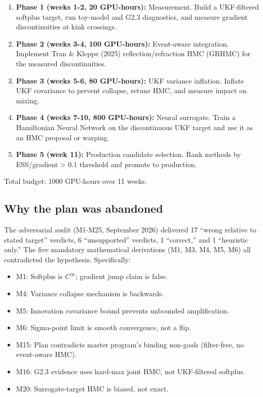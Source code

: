 \begin{enumerate}
\item \textbf{Phase 1 (weeks 1-2, 20 GPU-hours):} Measurement. Build a UKF-filtered softplus target, run toy-model and G2.3 diagnostics, and measure gradient discontinuities at kink crossings.
\item \textbf{Phase 2 (weeks 3-4, 100 GPU-hours):} Event-aware integration. Implement Tran \& Kleppe (2025) reflection/refraction HMC (GRHMC) for the measured discontinuities.
\item \textbf{Phase 3 (weeks 5-6, 80 GPU-hours):} UKF variance inflation. Inflate UKF covariance to prevent collapse, retune HMC, and measure impact on mixing.
\item \textbf{Phase 4 (weeks 7-10, 800 GPU-hours):} Neural surrogate. Train a Hamiltonian Neural Network on the discontinuous UKF target and use it as an HMC proposal or warping.
\item \textbf{Phase 5 (week 11):} Production candidate selection. Rank methods by ESS/gradient > 0.1 threshold and promote to production.
\end{enumerate}

Total budget: 1000 GPU-hours over 11 weeks.

\subsection{Why the plan was abandoned}

The adversarial audit (M1-M25, September 2026) delivered 17 ``wrong relative to stated target'' verdicts, 6 ``unsupported'' verdicts, 1 ``correct,'' and 1 ``heuristic only.'' The five mandatory mathematical derivations (M1, M3, M4, M5, M6) all contradicted the hypothesis. Specifically:
\begin{itemize}
\item M1: Softplus is $C^\infty$; gradient jump claim is false.
\item M4: Variance collapse mechanism is backwards.
\item M5: Innovation covariance bound prevents unbounded amplification.
\item M6: Sigma-point limit is smooth convergence, not a flip.
\item M15: Plan contradicts master program's binding non-goals (filter-free, no event-aware HMC).
\item M16: G2.3 evidence uses hard-max joint HMC, not UKF-filtered softplus.
\item M20: Surrogate-target HMC is biased, not exact.
\end{itemize}

